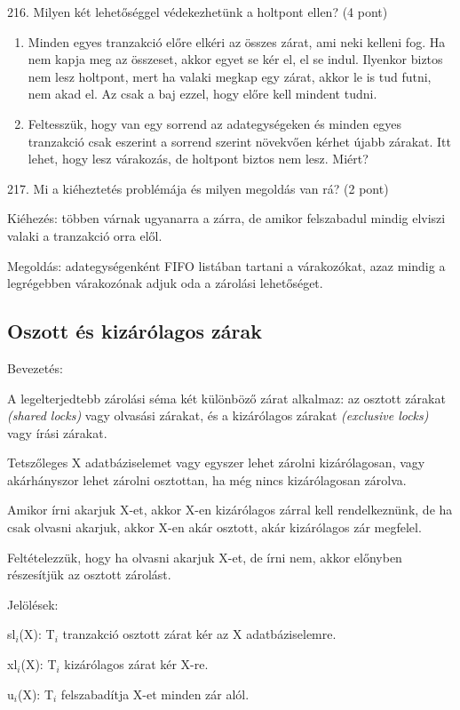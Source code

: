 \documentclass[a4paper,11.5pt, table]{article}
\begin{document}
216. Milyen két lehetőséggel védekezhetünk a holtpont ellen? (4 pont)
	\begin{enumerate}[label = \alph*)]
		\item Minden egyes tranzakció előre elkéri az összes zárat, ami neki kelleni fog. Ha nem kapja meg az összeset, akkor egyet se kér el, el se indul.
		Ilyenkor biztos nem lesz holtpont, mert ha valaki megkap egy zárat, akkor le is tud futni, nem akad el. Az csak a baj ezzel, hogy előre kell mindent tudni.
		\item Feltesszük, hogy van egy sorrend az adategységeken és minden egyes tranzakció csak eszerint a sorrend szerint növekvően kérhet újabb zárakat. Itt lehet, hogy lesz várakozás, de holtpont biztos nem lesz. Miért?
	\end{enumerate}

217. Mi a kiéheztetés problémája és milyen megoldás van rá? (2 pont)
	\begin{compactitem}
		\item Kiéhezés: többen várnak ugyanarra a
		zárra, de amikor felszabadul mindig elviszi valaki a tranzakció orra elől.
		\item Megoldás: adategységenként FIFO listában tartani a várakozókat, azaz mindig a legrégebben várakozónak adjuk oda a zárolási lehetőséget.		
	\end{compactitem}

\subsection{Oszott és kizárólagos zárak}

Bevezetés:
	\begin{compactitem}
		\item A legelterjedtebb zárolási séma két különböző zárat alkalmaz: az osztott zárakat\textit{ (shared locks)} vagy olvasási zárakat, és a kizárólagos zárakat\textit{ (exclusive locks)} vagy írási zárakat. 
		\item Tetszőleges X adatbáziselemet vagy egyszer lehet zárolni kizárólagosan, vagy akárhányszor lehet zárolni osztottan, ha még nincs kizárólagosan zárolva. 
		\item Amikor írni akarjuk X-et, akkor X-en kizárólagos zárral kell rendelkeznünk, de ha csak olvasni akarjuk, akkor X-en akár osztott, akár kizárólagos zár megfelel. 
		\item Feltételezzük, hogy ha olvasni akarjuk X-et, de írni nem, akkor előnyben részesítjük az osztott zárolást.
		\item Jelölések:
		\begin{compactitem}
			\item sl$ _{i} $(X): T$ _{i} $ tranzakció osztott zárat kér az X adatbáziselemre.
			\item xl$ _{i} $(X): T$ _{i} $ kizárólagos zárat kér X-re.
			\item u$ _{i} $(X): T$ _{i} $ felszabadítja X-et minden zár alól.
		\end{compactitem}
	\end{compactitem}
\end{document}
